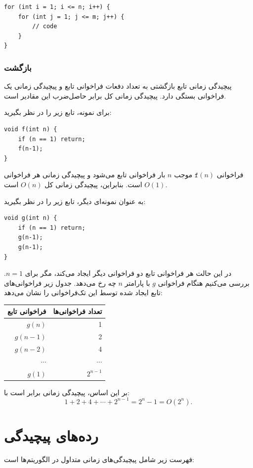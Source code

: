 \begin{lstlisting}
for (int i = 1; i <= n; i++) {
    for (int j = 1; j <= m; j++) {
        // code
    }
}
\end{lstlisting}

\subsubsection*{بازگشت}

پیچیدگی زمانی تابع بازگشتی به تعداد دفعات فراخوانی تابع و پیچیدگی زمانی یک فراخوانی بستگی دارد.
پیچیدگی زمانی کل برابر حاصل‌ضرب این مقادیر است.

برای نمونه، تابع زیر را در نظر بگیرید:
\begin{lstlisting}
void f(int n) {
    if (n == 1) return;
    f(n-1);
}
\end{lstlisting}
فراخوانی $\texttt{f}(n)$ موجب $n$ بار فراخوانی تابع می‌شود و پیچیدگی زمانی هر فراخوانی $O(1)$ است.
بنابراین، پیچیدگی زمانی کل $O(n)$ است.

به عنوان نمونه‌ای دیگر، تابع زیر را در نظر بگیرید:
\begin{lstlisting}
void g(int n) {
    if (n == 1) return;
    g(n-1);
    g(n-1);
}
\end{lstlisting}
در این حالت هر فراخوانی تابع دو فراخوانی دیگر ایجاد می‌کند، مگر برای $n=1$.
بررسی می‌کنیم هنگام فراخوانی $g$ با پارامتر $n$ چه رخ می‌دهد.
جدول زیر فراخوانی‌های تابع ایجاد شده توسط این تک‌فراخوانی را نشان می‌دهد:
\begin{center}
\begin{tabular}{rr}
فراخوانی تابع & تعداد فراخوانی‌ها \\
\hline
$g(n)$ & 1 \\
$g(n-1)$ & 2 \\
$g(n-2)$ & 4 \\
$\cdots$ & $\cdots$ \\
$g(1)$ & $2^{n-1}$ \\
\end{tabular}
\end{center}
بر این اساس، پیچیدگی زمانی برابر است با:
\[1+2+4+\cdots+2^{n-1} = 2^n-1 = O(2^n).\]

\section{رده‌های پیچیدگی}


فهرست زیر شامل پیچیدگی‌های زمانی متداول در الگوریتم‌ها است:

